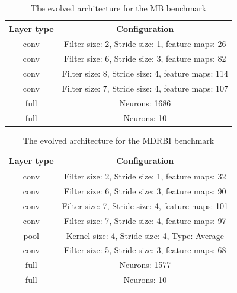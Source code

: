 \documentclass[conference]{IEEEtran}
\begin{document}
\begin{table}[!t]
	\renewcommand{\arraystretch}{1.3}
	\caption{The evolved architecture for the MB benchmark}
	\label{table:EvolvedMBCNN}
	\centering
	\begin{tabular}{|c|c|}
		\hline
		Layer type & Configuration\\
		\hline
		conv & Filter size: 2, Stride size: 1, feature maps: 26\\
		\hline
		conv & Filter size: 6, Stride size: 3, feature maps: 82\\
		\hline
		conv & Filter size: 8, Stride size: 4, feature maps: 114\\
		\hline
		conv & Filter size: 7, Stride size: 4, feature maps: 107\\
		\hline
		full & Neurons: 1686\\
		\hline
		full & Neurons: 10\\
		\hline
	\end{tabular}
\end{table}

\begin{table}[!t]
	\renewcommand{\arraystretch}{1.3}
	\caption{The evolved architecture for the MDRBI benchmark}
	\label{table:EvolvedMDRBICNN}
	\centering
	\begin{tabular}{|c|c|}
		\hline
		Layer type & Configuration\\
		\hline
		conv & Filter size: 2, Stride size: 1, feature maps: 32\\
		\hline
		conv & Filter size: 6, Stride size: 3, feature maps: 90\\
		\hline
		conv & Filter size: 7, Stride size: 4, feature maps: 101\\
		\hline
		conv & Filter size: 7, Stride size: 4, feature maps: 97\\
		\hline
		pool & Kernel size: 4, Stride size: 4, Type: Average\\
		\hline
		conv & Filter size: 5, Stride size: 3, feature maps: 68\\
		\hline
		full & Neurons: 1577\\
		\hline
		full & Neurons: 10\\
		\hline
	\end{tabular}
\end{table}
\end{document}

